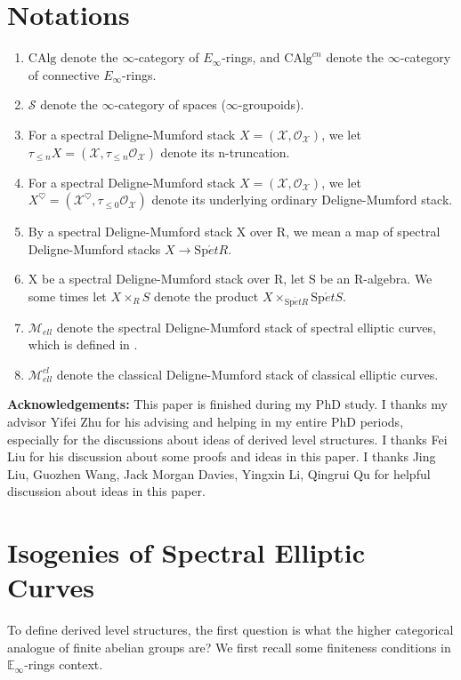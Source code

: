 \documentclass[12pt]{article}
\theoremstyle{thry}
\def  \CAlg     {\mathrm{CAlg}}
\def  \Spet     {\mathrm{Sp}\acute{e}t}
\def  \cm       {\mathcal{M}}
\def  \co       {\mathcal{O}}
\def  \cs       {\mathcal{S}}
\def  \cx       {\mathcal{X}}
\def  \be       {\mathbb{E}}
\begin{document}
 

\section*{Notations}
\begin{enumerate} 
	\item  $\CAlg$ denote the $\infty$-category of $E_{\infty}$-rings, and $\CAlg^{cn}$ denote the $\infty$-category of connective $E_{\infty}$-rings.
	\item  $\cs$ denote the $\infty$-category of spaces ($\infty$-groupoids).
	\item  For a spectral Deligne-Mumford stack $X =(\cx, \co_{\cx})$, we let $ \tau_{\leq n}X = (\cx, \tau_{\leq n} \co_{\cx})$ denote its n-truncation.
	\item  For a spectral Deligne-Mumford stack $X =(\cx, \co_{\cx})$, we let $X^{\heartsuit} = (\cx^{\heartsuit}, \tau_{\leq 0} \co_{\cx})$ denote its underlying ordinary Deligne-Mumford stack.
	\item By a spectral Deligne-Mumford stack X over R, we mean a map of spectral Deligne-Mumford stacks $X \to \Spet R$.
	\item  X be a spectral Deligne-Mumford stack over R, let S be an R-algebra. We some times let $X  \times_R S$ denote the product $X \times_{\Spet R} \Spet S$.
	\item  $\cm_{ell}$ denote the spectral Deligne-Mumford stack of spectral elliptic curves, which is defined in \cite{lu-EC1}.
	\item  $\cm^{cl}_{ell}$ denote the classical Deligne-Mumford stack of classical elliptic curves.
	
\end{enumerate}


\textbf{Acknowledgements:} This paper is finished during my PhD study. I thanks my advisor Yifei Zhu for his advising and helping in my entire PhD periods, especially for the discussions about ideas of derived level structures. I thanks Fei Liu for his discussion about some proofs and ideas in this paper. I thanks Jing Liu, Guozhen Wang, Jack Morgan Davies, Yingxin Li, Qingrui Qu for helpful discussion about ideas in this paper.




\section{Isogenies of Spectral Elliptic Curves}


\quad To define derived level structures, the first question is what the higher categorical analogue of finite abelian groups are? We first recall some finiteness conditions in $\be_{\infty}$-rings context.  
\end{document}
